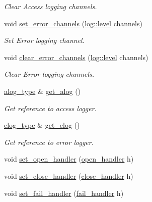 \begin{DoxyCompactItemize}
\begin{DoxyCompactList}\small\item\em Clear Access logging channels. \end{DoxyCompactList}\item 
void \hyperlink{classwebsocketpp_1_1endpoint_a8292bcdca9344b57af1b0964ff7fc778}{set\+\_\+error\+\_\+channels} (\hyperlink{namespacewebsocketpp_1_1log_a12d4d17939f102db8c9183d400a41960}{log\+::level} channels)
\begin{DoxyCompactList}\small\item\em Set Error logging channel. \end{DoxyCompactList}\item 
void \hyperlink{classwebsocketpp_1_1endpoint_a8cefa4fc37c0df4eb6ed0bcf04bb0da5}{clear\+\_\+error\+\_\+channels} (\hyperlink{namespacewebsocketpp_1_1log_a12d4d17939f102db8c9183d400a41960}{log\+::level} channels)
\begin{DoxyCompactList}\small\item\em Clear Error logging channels. \end{DoxyCompactList}\item 
\hyperlink{classwebsocketpp_1_1endpoint_a1ca2ad5bfdd241a031746c3f158f4003}{alog\+\_\+type} \& \hyperlink{classwebsocketpp_1_1endpoint_a1607d873b9e764c02563162f03171326}{get\+\_\+alog} ()
\begin{DoxyCompactList}\small\item\em Get reference to access logger. \end{DoxyCompactList}\item 
\hyperlink{classwebsocketpp_1_1endpoint_a4ab98f4fed5b5b2740105eff732c7b1e}{elog\+\_\+type} \& \hyperlink{classwebsocketpp_1_1endpoint_a63ed630042ce9549dfc7d9513cb19678}{get\+\_\+elog} ()
\begin{DoxyCompactList}\small\item\em Get reference to error logger. \end{DoxyCompactList}\item 
void \hyperlink{classwebsocketpp_1_1endpoint_a5753d9848aefc04ee91da401c0cc65b8}{set\+\_\+open\+\_\+handler} (\hyperlink{namespacewebsocketpp_a53c8b4ae59cf13b5f883b119bbd14d72}{open\+\_\+handler} h)
\item 
void \hyperlink{classwebsocketpp_1_1endpoint_a8d7d95bebc154879655211e2b0b5e069}{set\+\_\+close\+\_\+handler} (\hyperlink{namespacewebsocketpp_a27acb39e01cbca06ccc4e4e8eb8f877d}{close\+\_\+handler} h)
\item 
void \hyperlink{classwebsocketpp_1_1endpoint_a073540365f5c810f5a45e5fc76f52f87}{set\+\_\+fail\+\_\+handler} (\hyperlink{namespacewebsocketpp_a5bb2e61cfe649b2e012f1a2c5693a4d5}{fail\+\_\+handler} h)

\end{DoxyCompactItemize}
